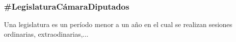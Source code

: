 \subsubsection{\#LegislaturaCámaraDiputados}

Una legislatura es un período menor a un año en el cual se realizan
sesiones ordinarias, extraodinarias,...

\begin{description}
  
\end{description}